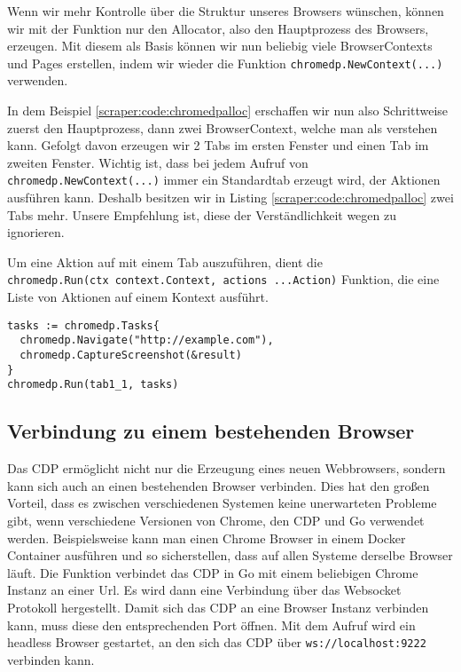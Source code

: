 
Wenn wir mehr Kontrolle über die Struktur unseres Browsers wünschen, können wir mit der Funktion  nur den Allocator, also den Hauptprozess des Browsers, erzeugen. Mit diesem als Basis können wir nun beliebig viele BrowserContexts und Pages erstellen, indem wir wieder die Funktion \texttt{chromedp.NewContext(...)} verwenden. 


In dem Beispiel \ref{scraper:code:chromedpalloc} erschaffen wir nun also Schrittweise zuerst den Hauptprozess, dann zwei BrowserContext, welche man als  verstehen kann. Gefolgt davon erzeugen wir 2 Tabs im ersten Fenster und einen Tab im zweiten Fenster. Wichtig ist, dass bei jedem Aufruf von \texttt{chromedp.NewContext(...)} immer ein Standardtab erzeugt wird, der Aktionen ausführen kann. Deshalb besitzen wir in Listing \ref{scraper:code:chromedpalloc} zwei Tabs mehr. Unsere Empfehlung ist, diese der Verständlichkeit wegen zu ignorieren. 

Um eine Aktion auf mit einem Tab auszuführen, dient die \\
\texttt{chromedp.Run(ctx context.Context, actions ...Action)} Funktion, die eine Liste von Aktionen auf einem Kontext ausführt. 
\begin{verbatim}
tasks := chromedp.Tasks{
  chromedp.Navigate("http://example.com"),
  chromedp.CaptureScreenshot(&result)
}
chromedp.Run(tab1_1, tasks)
\end{verbatim}
\pagebreak
\subsection{Verbindung zu einem bestehenden Browser} \label{scraper:subsec:go:remote}
Das CDP ermöglicht nicht nur die Erzeugung eines neuen Webbrowsers, sondern kann sich auch an einen bestehenden Browser verbinden. Dies hat den großen Vorteil, dass es zwischen verschiedenen Systemen keine unerwarteten Probleme gibt, wenn verschiedene Versionen von Chrome, den CDP und Go verwendet werden. Beispielsweise kann man einen Chrome Browser in einem Docker Container ausführen und so sicherstellen, dass auf allen Systeme derselbe Browser läuft. Die Funktion  verbindet das CDP in Go mit einem beliebigen Chrome Instanz an einer Url. Es wird dann eine Verbindung über das Websocket Protokoll hergestellt. Damit sich das CDP an eine Browser Instanz verbinden kann, muss diese den entsprechenden Port öffnen. Mit dem Aufruf  wird ein headless Browser gestartet, an den sich das CDP über  \verb|ws://localhost:9222| verbinden kann.

